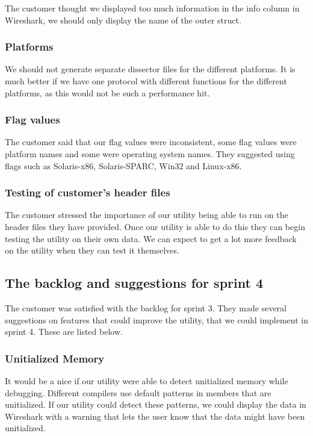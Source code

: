 The customer thought we displayed too much information in the info column in Wireshark,
 we should only display the name of the outer struct.

\subsubsection{Platforms}

We should not generate separate dissector files for the different platforms. It is much better if we have one protocol
with different functions for the different platforms, as this would not be such a performance hit.

\subsubsection{Flag values}

The customer said that our flag values were inconsistent, some flag values were platform names and some were operating
system names. They suggested using flags such as Solaris-x86, Solaris-SPARC, Win32 and Linux-x86.

\subsubsection{Testing of customer's header files}

The customer stressed the importance of our utility being able to run on the header files they have provided.
Once our utility is able to do this they can begin testing the utility on their own data.
We can expect to get a lot more feedback on the utility when they can test it themselves.


\subsection{The backlog and suggestions for sprint 4}

The customer was satisfied with the backlog for sprint 3.
They made several suggestions on features that could improve the utility, that we could implement in sprint 4.
These are listed below.

\subsubsection{Unitialized Memory}

It would be a nice if our utility were able to detect unitialized memory while debugging.
Different compilers use default patterns in members that are unitialized. If our utility could detect these patterns,
we could display the data in Wireshark with a warning that lets the user know that the data might have been unitialized.

